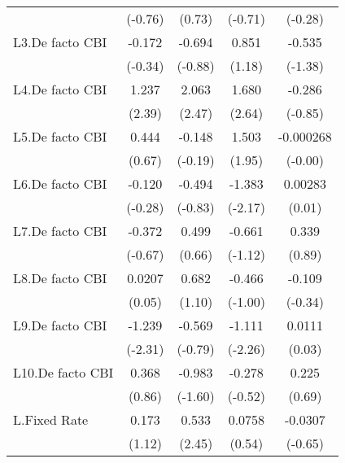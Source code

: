 {\begin{longtable}{l*{4}{c}}
                &  (-0.76)         &   (0.73)         &  (-0.71)         &  (-0.28)         \\
[1em]
L3.De facto CBI &   -0.172         &   -0.694         &    0.851         &   -0.535         \\
                &  (-0.34)         &  (-0.88)         &   (1.18)         &  (-1.38)         \\
[1em]
L4.De facto CBI &    1.237\sym{*}  &    2.063\sym{*}  &    1.680\sym{**} &   -0.286         \\
                &   (2.39)         &   (2.47)         &   (2.64)         &  (-0.85)         \\
[1em]
L5.De facto CBI &    0.444         &   -0.148         &    1.503         &-0.000268         \\
                &   (0.67)         &  (-0.19)         &   (1.95)         &  (-0.00)         \\
[1em]
L6.De facto CBI &   -0.120         &   -0.494         &   -1.383\sym{*}  &  0.00283         \\
                &  (-0.28)         &  (-0.83)         &  (-2.17)         &   (0.01)         \\
[1em]
L7.De facto CBI &   -0.372         &    0.499         &   -0.661         &    0.339         \\
                &  (-0.67)         &   (0.66)         &  (-1.12)         &   (0.89)         \\
[1em]
L8.De facto CBI &   0.0207         &    0.682         &   -0.466         &   -0.109         \\
                &   (0.05)         &   (1.10)         &  (-1.00)         &  (-0.34)         \\
[1em]
L9.De facto CBI &   -1.239\sym{*}  &   -0.569         &   -1.111\sym{*}  &   0.0111         \\
                &  (-2.31)         &  (-0.79)         &  (-2.26)         &   (0.03)         \\
[1em]
L10.De facto CBI&    0.368         &   -0.983         &   -0.278         &    0.225         \\
                &   (0.86)         &  (-1.60)         &  (-0.52)         &   (0.69)         \\
[1em]
L.Fixed Rate    &    0.173         &    0.533\sym{*}  &   0.0758         &  -0.0307         \\
                &   (1.12)         &   (2.45)         &   (0.54)         &  (-0.65)         \\

\end{longtable}}
